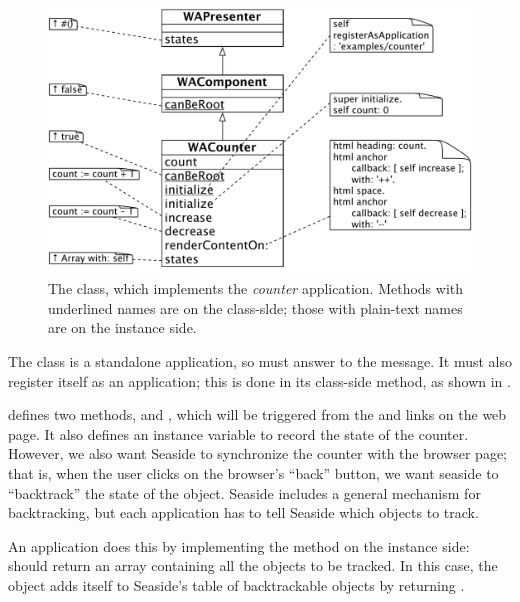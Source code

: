 \documentclass[a4paper,10pt,twoside]{book}
\begin{document}
\begin{figure}[ht]
\begin{center}
\includegraphics[width=\textwidth]{WACounter}
\caption{The  class, which implements the \emph{counter} application.  Methods with underlined names are on the class-slde; those with plain-text names are on the instance side.}
\label{fig:WACounter}
\end{center}
\end{figure}

The class  is a standalone application, so  must answer  to the   message.
It must also register itself as an application; this is done in its class-side  method, as shown in .

 defines two methods,  and , which will be triggered from the \link{++} and \link{--\,--} links on the web page.  
It also defines an instance variable  to record the state of the counter.
However, we also want Seaside to synchronize the counter with the browser page; that is, when the user clicks on the browser's ``back'' button, we want seaside to ``backtrack'' the state of the  object.
Seaside includes a general mechanism for backtracking, but each application has to tell Seaside which objects to track.  

An application  does this by implementing the  method on the instance side:
 should return an array containing all the objects to be tracked.
In this case, the  object adds itself to Seaside's table of backtrackable objects by returning . 
\end{document}
